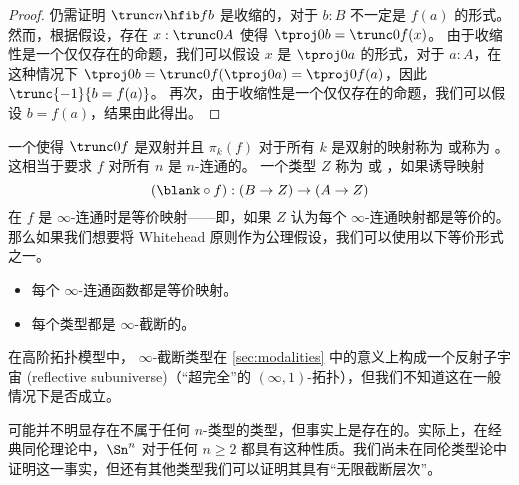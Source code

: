 {\begin{proof}
  仍需证明 $\trunc n{\hfib f{b}}$ 是收缩的，对于 $b:B$ 不一定是 $f(a)$ 的形式。
  然而，根据假设，存在 $x:\trunc0A$ 使得 $\tproj 0b = \trunc0f(x)$。
  由于收缩性是一个仅仅存在的命题，我们可以假设 $x$ 是 $\tproj0a$ 的形式，对于 $a:A$，在这种情况下 $\tproj 0 b = \trunc0f(\tproj0a) = \tproj0{f(a)}$，因此 $\trunc{-1}{b=f(a)}$。
  再次，由于收缩性是一个仅仅存在的命题，我们可以假设 $b=f(a)$，结果由此得出。
\end{proof}

一个使得 $\trunc0f$ 是双射并且 $\pi_k(f)$ 对于所有 $k$ 是双射的映射称为 %
%
或称为 %
%
。
这相当于要求 $f$ 对所有 $n$ 是 $n$-连通的。
一个类型 $Z$ 称为 %
%
或 %
%
，如果诱导映射
\[(\blank\circ f):(B\to Z) \to (A\to Z)\]
在 $f$ 是 $\infty$-连通时是等价映射——即，如果 $Z$ 认为每个 $\infty$-连通映射都是等价的。
%
那么如果我们想要将 Whitehead 原则作为公理假设，我们可以使用以下等价形式之一。
\begin{itemize}
  \item 每个 $\infty$-连通函数都是等价映射。
  \item 每个类型都是 $\infty$-截断的。
\end{itemize}
在高阶拓扑模型中，
%
$\infty$-截断类型在 \cref{sec:modalities} 中的意义上构成一个反射子宇宙 (reflective subuniverse)（“超完全”的 $(\infty,1)$-拓扑），但我们不知道这在一般情况下是否成立。

%
%

可能并不明显存在不属于任何 $n$-类型的类型，但事实上是存在的。实际上，在经典同伦理论中，$\Sn^n$ 对于任何 $n\ge 2$ 都具有这种性质。我们尚未在同伦类型论中证明这一事实，但还有其他类型我们可以证明其具有“无限截断层次”。

}
